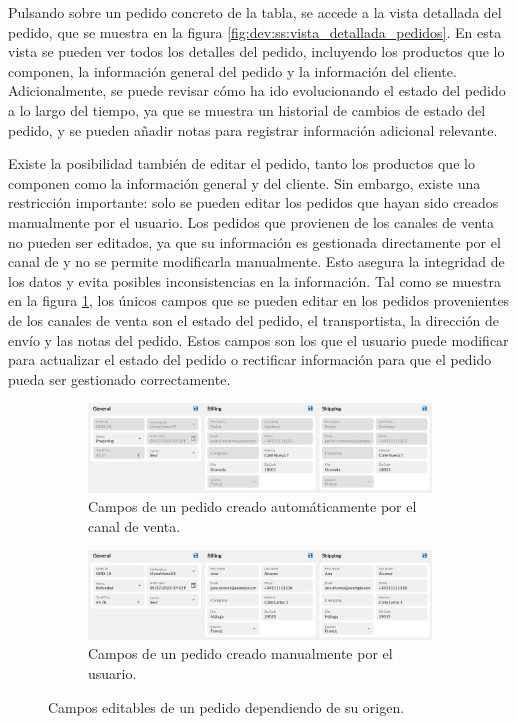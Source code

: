 Pulsando sobre un pedido concreto de la tabla, se accede a la vista detallada del pedido, que se muestra en la figura \ref{fig:dev:ss:vista_detallada_pedidos}. En esta vista se pueden ver todos los detalles del pedido, incluyendo los productos que lo componen, la información general del pedido y la información del cliente. Adicionalmente, se puede revisar cómo ha ido evolucionando el estado del pedido a lo largo del tiempo, ya que se muestra un historial de cambios de estado del pedido, y se pueden añadir notas para registrar información adicional relevante.

Existe la posibilidad también de editar el pedido, tanto los productos que lo componen como la información general y del cliente. Sin embargo, existe una restricción importante: solo se pueden editar los pedidos que hayan sido creados manualmente por el usuario. Los pedidos que provienen de los canales de venta no pueden ser editados, ya que su información es gestionada directamente por el canal de y no se permite modificarla manualmente. Esto asegura la integridad de los datos y evita posibles inconsistencias en la información. Tal como se muestra en la figura \ref{fig:dev:ss:campos_editables_pedido}, los únicos campos que se pueden editar en los pedidos provenientes de los canales de venta son el estado del pedido, el transportista, la dirección de envío y las notas del pedido. Estos campos son los que el usuario puede modificar para actualizar el estado del pedido o rectificar información para que el pedido pueda ser gestionado correctamente.

\begin{figure}[H]
    \centering
    \begin{subfigure}{\linewidth}
        \centering
        \includegraphics[width=0.8\linewidth]{figures/design_develop/screenshots/campos_bloqueados.png}
        \caption{Campos de un pedido creado automáticamente por el canal de venta.}
    \end{subfigure}
    \vspace{1em}
    \begin{subfigure}{\linewidth}
        \centering
        \includegraphics[width=0.8\linewidth]{figures/design_develop/screenshots/campos_no_bloqueados.png}
        \caption{Campos de un pedido creado manualmente por el usuario.}
    \end{subfigure}
    \caption{Campos editables de un pedido dependiendo de su origen.}
    \label{fig:dev:ss:campos_editables_pedido}
\end{figure}

